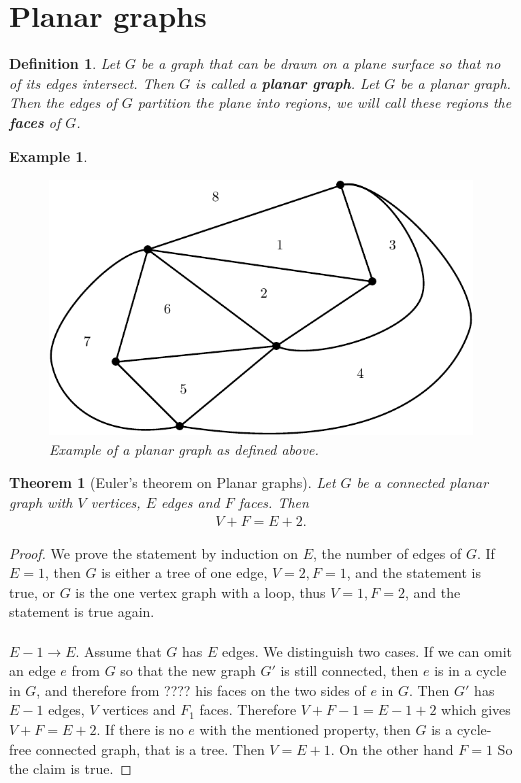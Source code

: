\documentclass[12pt,a4paper]{article}
\newtheorem{thm}{Theorem}[section]
\newtheorem{defn}{Definition}[section]
\newtheorem{exmp}{Example}[section]
\theoremstyle{definition}
\begin{document}
\section{Planar graphs}
\begin{defn} Let $G$ be a graph that can be drawn on a plane surface so that no of its edges intersect. Then $G$ is called a \textbf{planar graph}. Let $G$ be a planar graph. Then the edges of $G$ partition the plane into regions,  we will call these regions the \textbf{faces} of $G$. 
\end{defn}
\begin{exmp} \
\begin{figure}[hbtp]
\centering
\includegraphics[scale=.9]{images/graph47.pdf}
\caption{Example of a planar graph as defined above.}
\end{figure}
\end{exmp}
\begin{thm}[Euler's theorem on Planar graphs] Let $G$ be a connected planar graph with $V$ vertices, $E$ edges and $F$ faces. Then 
\begin{align*}
V+F=E+2.
\end{align*}
\end{thm}
\begin{proof}
We prove the statement by induction on $E$, the number of edges of $G$. If $E=1$, then $G$ is either a tree of one edge, $V=2,F=1$, and the statement is true, or $G$ is the one vertex graph with a loop, thus $V=1, F=2$, and the statement is true again. \\\\
$E-1 \to E$. Assume that $G$ has $E$ edges. We distinguish two cases. If we can omit an edge $e$ from $G$ so that the new graph $G'$ is still connected, then $e$ is in a cycle in $G$, and therefore from  ???? his faces on the two sides of $e$ in $G$. Then $G'$ has $E-1$ edges, $V$ vertices and $F_1$ faces. Therefore $V+F-1=E-1+2$ which gives $V+F=E+2$. If there is no $e$ with the mentioned property, then $G$ is a cycle-free connected graph, that is a tree. Then $V=E+1$. On the other hand $F=1$ So the claim is true. 
\end{proof}
\end{document}
